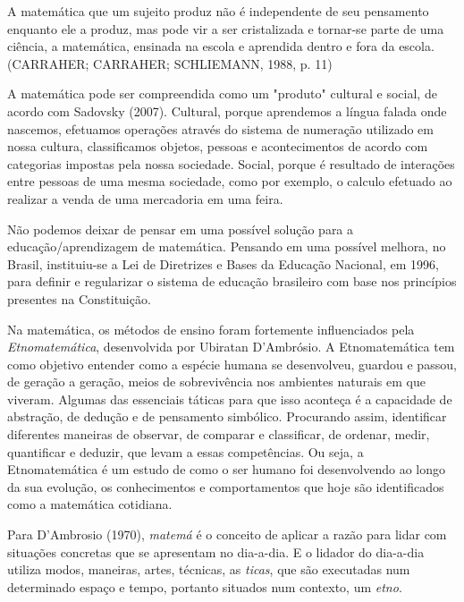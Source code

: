 \documentclass[brasil]{abnt}
\begin{document}
		\begin{citacao}A matemática que um sujeito produz não é independente de seu pensamento enquanto ele a produz, mas pode vir a ser cristalizada e tornar-se parte de uma 
					ciência, a matemática, ensinada na escola e aprendida dentro e fora da escola. (CARRAHER; CARRAHER; SCHLIEMANN, 1988, p. 11)
		\end{citacao}
    
    A matemática pode ser compreendida como um "produto" cultural e social, de acordo com Sadovsky (2007). Cultural, porque aprendemos a língua falada onde nascemos, efetuamos operações 
    através do sistema de numeração utilizado em nossa cultura, classificamos objetos, pessoas e acontecimentos de acordo com categorias impostas pela nossa 
    sociedade. Social, porque é resultado de interações entre pessoas de uma mesma sociedade, como por exemplo, o calculo efetuado ao realizar a venda de uma 
    mercadoria em uma feira.
    
    Não podemos deixar de pensar em uma possível solução para a educação/aprendizagem de matemática. Pensando em uma possível melhora, no Brasil, instituiu-se a 
    Lei de Diretrizes e Bases da Educação Nacional, em 1996, para definir e regularizar o sistema de educação brasileiro com base nos princípios presentes na Constituição. 
    
    Na matemática, os métodos de ensino foram fortemente influenciados pela \textit{Etnomatemática}, desenvolvida 
    por Ubiratan D’Ambrósio. A Etnomatemática tem como objetivo entender como a espécie humana se desenvolveu, guardou e passou, de geração a geração, meios de sobrevivência nos ambientes naturais em que viveram. 
	Algumas das essenciais táticas para que isso aconteça é a capacidade de abstração, de dedução e de pensamento simbólico. Procurando assim, identificar diferentes maneiras de observar,
	de comparar e classificar, de ordenar, medir, quantificar e deduzir, que levam a essas competências. Ou seja, a Etnomatemática é um estudo de como o ser humano foi desenvolvendo ao longo da sua
	evolução, os conhecimentos e comportamentos que hoje são identificados como a matemática cotidiana.
			
	Para D'Ambrosio (1970), \textit{matemá} é o conceito de aplicar a razão para lidar com situações concretas que se apresentam no dia-a-dia. E o lidador do dia-a-dia utiliza modos, maneiras, 
	artes, técnicas, as \textit{ticas}, que são executadas num determinado espaço e tempo, portanto situados num contexto, um \textit{etno}. 
			
\end{document}
